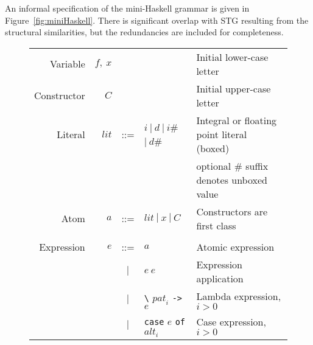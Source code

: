 \documentclass{llncs}
\begin{document}
An informal specification of the mini-Haskell grammar is given in
Figure~\ref{fig:miniHaskell}.  There is significant overlap with STG resulting
from the structural similarities, but the redundancies are included for
completeness.





\newcommand{\hash}{{\scriptsize\#}}

\begin{figure}
\centering
\footnotesize %
\begin{tabular}{r r c l l}
Variable         & $f,\ x$             &     &
& Initial lower-case letter \\

Constructor        & $C$                 &     & 
& Initial upper-case letter \\

Literal            & $\mathit{lit}$      & ::= & $i\ |\ d\ 
                                                 |\ i$\hash\ $|\ d$\hash
& Integral or floating point literal (boxed) \\

                   &                     &     & 
& optional \# suffix denotes unboxed value \\

Atom               & $a$                 & ::= & $\mathit{lit}\ |\ x\ |\ C$
& Constructors are first class \\ 
\\


Expression         & $e$                 & ::= & $a$
& Atomic expression \\

                   &                     & $|$ & $e\ e$
& Expression application \\

                   &                     & $|$ & \texttt{\textbackslash} $\mathit{pat}_i$ 
                                               \texttt{->} $e$
& Lambda expression, $i > 0$ \\

                   &                     & $|$ & \texttt{case} $e$ \texttt{of} $\mathit{alt}_i$
& Case expression, $i > 0$\\


\end{tabular}
\end{figure}
\end{document}
